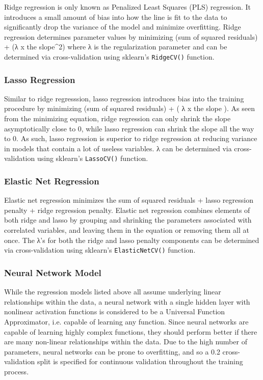 \documentclass[11pt]{article}
\begin{document}
Ridge regression is only known as Penalized Least Squares (PLS)
regression. It introduces a small amount of bias into how the line is
fit to the data to significantly drop the variance of the model and
minimize overfitting. Ridge regression determines parameter values by
minimizing (sum of squared residuals) + (λ x the slope\^{}2) where λ is
the regularization parameter and can be determined via cross-validation
using sklearn's \texttt{RidgeCV()} function.

\subsubsection*{Lasso Regression}

Similar to ridge regresssion, lasso regression introduces bias into the
training procedure by minimizing (sum of squared residuals) + ( λ x the
slope ). As seen from the minimizing equation, ridge regression can only
shrink the slope asymptotically close to 0, while lasso regression can
shrink the slope all the way to 0. As such, lasso regression is superior
to ridge regression at reducing variance in models that contain a lot of
useless variables. λ can be determined via cross-validation using
sklearn's \texttt{LassoCV()} function.

\subsubsection*{Elastic Net Regression}

Elastic net regression minimizes the sum of squared residuals + lasso
regression penalty + ridge regression penalty. Elastic net regression
combines elements of both ridge and lasso by grouping and shrinking the
parameters associated with correlated variables, and leaving them in the
equation or removing them all at once. The λ's for both the ridge and
lasso penalty components can be determined via cross-validation using
sklearn's \texttt{ElasticNetCV()} function.

\subsubsection*{Neural Network Model}

While the regression models listed above all assume underlying linear
relationships within the data, a neural network with a single hidden
layer with nonlinear activation functions is considered to be a
Universal Function Approximator, i.e. capable of learning any function.
Since neural networks are capable of learning highly complex functions,
they should perform better if there are many non-linear relationships
within the data. Due to the high number of parameters, neural networks
can be prone to overfitting, and so a 0.2 cross-validation split is
specified for continuous validation throughout the training process.
\end{document}
